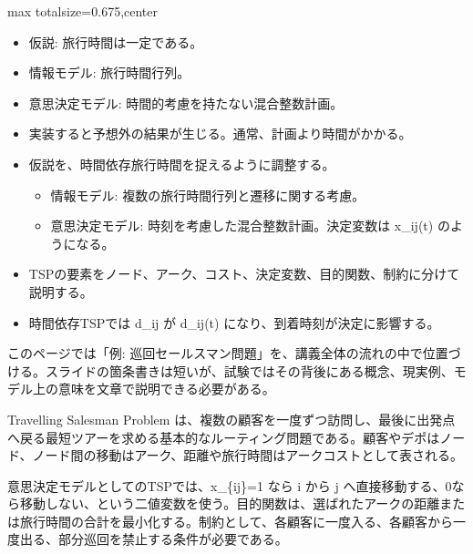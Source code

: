 \clearpage
{}
\begin{adjustbox}{max totalsize={\textwidth}{0.675\textheight},center}
\begin{minipage}{\textwidth}\scriptsize
\begin{minipage}[t]{0.485\textwidth}
\begin{itemize}
\item 仮説: 旅行時間は一定である。
\item 情報モデル: 旅行時間行列。
\item 意思決定モデル: 時間的考慮を持たない混合整数計画。
\item 実装すると予想外の結果が生じる。通常、計画より時間がかかる。
\item 仮説を、時間依存旅行時間を捉えるように調整する。
\begin{itemize}
\item 情報モデル: 複数の旅行時間行列と遷移に関する考慮。
\item 意思決定モデル: 時刻を考慮した混合整数計画。決定変数は x\_ij(t) のようになる。
\end{itemize}
\end{itemize}
\begin{itemize}
\item TSPの要素をノード、アーク、コスト、決定変数、目的関数、制約に分けて説明する。
\item 時間依存TSPでは d\_ij が d\_ij(t) になり、到着時刻が決定に影響する。
\end{itemize}
\end{minipage}\hfill
\begin{minipage}[t]{0.485\textwidth}
このページでは「例: 巡回セールスマン問題」を、講義全体の流れの中で位置づける。スライドの箇条書きは短いが、試験ではその背後にある概念、現実例、モデル上の意味を文章で説明できる必要がある。\par
Travelling Salesman Problem は、複数の顧客を一度ずつ訪問し、最後に出発点へ戻る最短ツアーを求める基本的なルーティング問題である。顧客やデポはノード、ノード間の移動はアーク、距離や旅行時間はアークコストとして表される。\par
意思決定モデルとしてのTSPでは、x\_\{ij\}=1 なら i から j へ直接移動する、0なら移動しない、という二値変数を使う。目的関数は、選ばれたアークの距離または旅行時間の合計を最小化する。制約として、各顧客に一度入る、各顧客から一度出る、部分巡回を禁止する条件が必要である。\par

\end{minipage}
\end{minipage}
\end{adjustbox}
